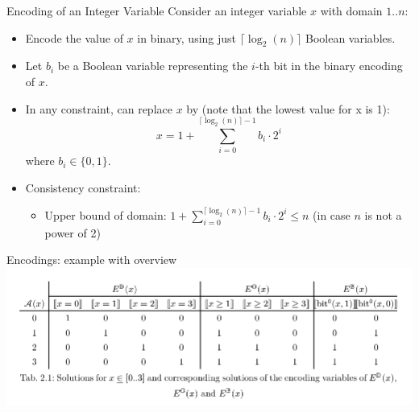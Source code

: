 \documentclass{cons-beamer}
\begin{document}
\begin{frame}{ Encoding of an Integer Variable}
  Consider an integer variable $x$ with domain $1..n$: \vfill
  \begin{itemize}
    \item Encode the value of $x$ in binary, using just $\lceil \log_2(n) \rceil$ Boolean variables. \vfill
    \item Let $b_i$ be a Boolean variable representing the $i$-th bit in the binary encoding of $x$. \vfill
    \item In any constraint, can replace $x$ by (note that the lowest value for x is 1):
      \[
      x = 1 + \sum_{i=0}^{\lceil \log_2(n) \rceil - 1} b_i \cdot 2^i
      \]
      where $b_i \in \{0, 1\}$. \vfill
    \item Consistency constraint: 
      \begin{itemize}
        \item Upper bound of domain:  $1 + \sum_{i=0}^{\lceil \log_2(n) \rceil - 1} b_i \cdot 2^i \leq n$ (in case $n$ is not a power of 2)
      \end{itemize}
  \end{itemize}
\end{frame}

\begin{frame}{Encodings: example with overview}
  \centering
  \includegraphics[width=\columnwidth]{images/encodings}
\end{frame}
\end{document}
